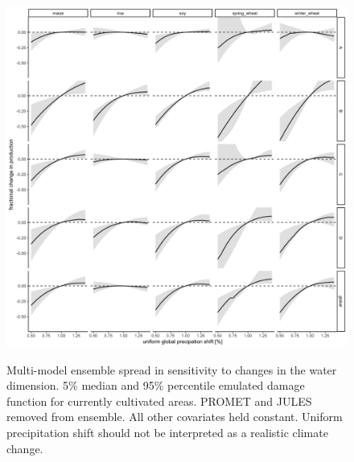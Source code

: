 \documentclass[10pt]{article}
\begin{document}
{\begin{figure}[h!]
\includegraphics[width=\textwidth]{s_water.png}\\
\caption{Multi-model ensemble spread in sensitivity to changes in the water dimension. 5\% median and 95\% percentile emulated damage function for currently cultivated areas. PROMET and JULES removed from ensemble. All other covariates held constant. Uniform precipitation shift should not be interpreted as a realistic climate change.}
\label{fig:water}
\end{figure}

}
\end{document}
